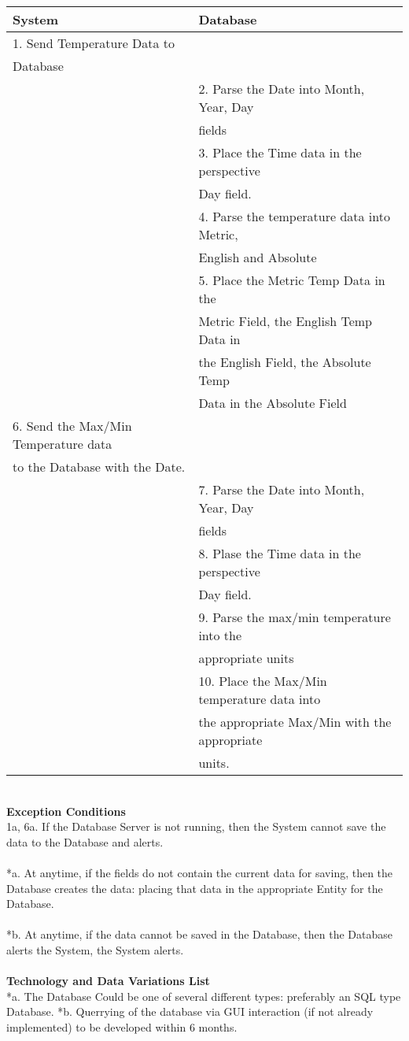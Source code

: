 \documentclass{article}
\begin{document}
\begin{tabular}{|l|l|}\hline
\textbf{System} & \textbf{Database}\\\hline
1.  Send Temperature Data to &\\
Database &\\\hline
& 2.  Parse the Date into Month, Year, Day\\
& fields\\\hline
& 3.  Place the Time data in the perspective\\
& Day field.\\\hline
& 4.  Parse the temperature data into Metric,\\
& English and Absolute\\\hline
& 5.  Place the Metric Temp Data in the\\
&  Metric Field, the English Temp Data in\\
&  the English Field, the Absolute Temp\\
&  Data in the Absolute Field\\\hline
6.  Send the Max/Min Temperature data &\\
to the Database with the Date. &\\\hline
& 7.  Parse the Date into Month, Year, Day\\
& fields\\\hline
& 8.  Plase the Time data in the perspective\\
& Day field.\\\hline
& 9.  Parse the max/min temperature into the\\
& appropriate units\\\hline
& 10.  Place the Max/Min temperature data into\\
& the appropriate Max/Min with the appropriate\\
& units.\\\hline
\end{tabular}
\\\textbf{Exception Conditions}\\
1a, 6a.  If the Database Server is not running, then the System
cannot save the data to the Database and alerts.\\\\
*a. At anytime, if the fields do not contain the current data for
saving, then the Database creates the data:  placing that data in
the appropriate Entity for the Database.\\\\
*b. At anytime, if the data cannot be saved in the Database, then the
Database alerts the System, the System alerts.\\\\
\textbf{Technology and Data Variations List}\\
*a.  The Database Could be one of several different types:
preferably an SQL type Database.
*b.  Querrying of the database via GUI interaction (if not already
implemented) to be developed within 6 months.
\end{document}
